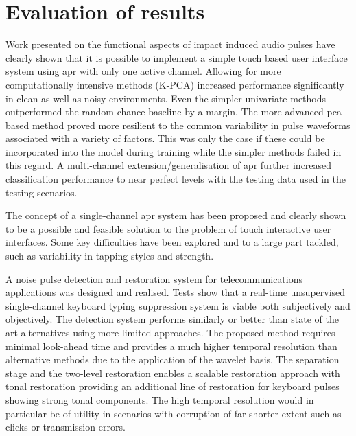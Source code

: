 \section{Evaluation of results}
Work presented on the functional aspects of impact induced audio pulses have clearly shown that it is possible to implement a simple touch based user interface system using \gls{apr} with only one active channel. Allowing for more computationally intensive methods (K-PCA) increased performance significantly in clean as well as noisy environments. Even the simpler univariate methods outperformed the random chance baseline by a margin. The more advanced \gls{pca} based method proved more resilient to the common variability in pulse waveforms associated with a variety of factors. This was only the case if these could be incorporated into the model during training while the simpler methods failed in this regard. A multi-channel extension/generalisation of \gls{apr} further increased classification performance to near perfect levels with the testing data used in the testing scenarios.

The concept of a single-channel \gls{apr} system has been proposed and clearly shown to be a possible and feasible solution to the problem of touch interactive user interfaces. Some key difficulties have been explored and to a large part tackled, such as variability in tapping styles and strength.

A noise pulse detection and restoration system for telecommunications applications was designed and realised. Tests show that a real-time unsupervised single-channel keyboard typing suppression system is viable both subjectively and objectively. The detection system performs similarly or better than state of the art alternatives using more limited approaches. The proposed method requires minimal look-ahead time and provides a much higher temporal resolution than alternative methods due to the application of the wavelet basis. The separation stage and the two-level restoration enables a scalable restoration approach with tonal restoration providing an additional line of restoration for keyboard pulses showing strong tonal components. The high temporal resolution would in particular be of utility in scenarios with corruption of far shorter extent such as clicks or transmission errors.

